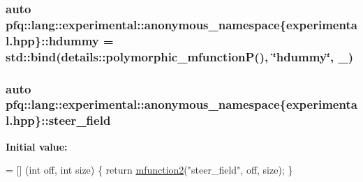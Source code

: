 \hypertarget{namespacepfq_1_1lang_1_1experimental_1_1anonymous__namespace_02experimental_8hpp_03_a6377eeaace811b051eaf2edffd4968f9}{
\subsubsection[{hdummy}]{\setlength{\rightskip}{0pt plus 5cm}auto pfq\+::lang\+::experimental\+::anonymous\+\_\+namespace\{experimental.\+hpp\}\+::hdummy = std\+::bind(details\+::polymorphic\+\_\+mfunction\+P(), \char`\"{}hdummy\char`\"{}, \+\_)}}\label{namespacepfq_1_1lang_1_1experimental_1_1anonymous__namespace_02experimental_8hpp_03_a6377eeaace811b051eaf2edffd4968f9}
\hypertarget{namespacepfq_1_1lang_1_1experimental_1_1anonymous__namespace_02experimental_8hpp_03_a0d8f14ccda9d387f662ec1b0f1f2de9b}{
\subsubsection[{steer\+\_\+field}]{\setlength{\rightskip}{0pt plus 5cm}auto pfq\+::lang\+::experimental\+::anonymous\+\_\+namespace\{experimental.\+hpp\}\+::steer\+\_\+field}}\label{namespacepfq_1_1lang_1_1experimental_1_1anonymous__namespace_02experimental_8hpp_03_a0d8f14ccda9d387f662ec1b0f1f2de9b}
{\bfseries Initial value\+:}
\begin{DoxyCode}
= [] (\textcolor{keywordtype}{int} off, \textcolor{keywordtype}{int} size) \{
                                \textcolor{keywordflow}{return} \hyperlink{namespacepfq_1_1lang_aab1a000712bb2711044255ca1626cc84}{mfunction2}(\textcolor{stringliteral}{"steer\_field"}, off, size);
                           \}
\end{DoxyCode}
